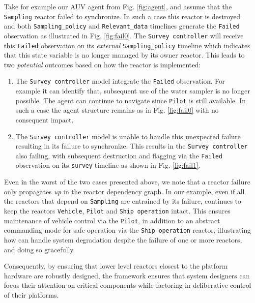 Take for example our AUV agent from Fig. \ref{fig:agent}, and assume
that the \texttt{Sampling} reactor failed to synchronize. In such a
case this reactor is destroyed and both \texttt{Sampling\_policy} and
\texttt{Relevant\_data} timelines generate the \texttt{Failed}
observation as illustrated in Fig. \ref{fig:fail0}.  The
\texttt{Survey controller} will receive this \texttt{Failed}
observation on its {\em external} \texttt{Sampling\_policy} timeline
which indicates that this state variable is no longer managed by its
owner reactor. This leads to two \emph{potential} outcomes based on
how the reactor is implemented:

\begin{enumerate}

\item The \texttt{Survey controller} model  integrate
  the \texttt{Failed} observation. For example it can identify that,
  subsequent use of the water sampler is no longer possible.  The \rx
  agent can continue to navigate since \texttt{Pilot} is still
  available. In such a case the agent structure remains as in
  Fig. \ref{fig:fail0} with no consequent impact.

\item The \texttt{Survey controller} model is unable to handle this
  unexpected failure resulting in its failure to synchronize. This
  results in the \texttt{Survey controller} also failing, with
  subsequent destruction and flagging via the \texttt{Failed}
  observation on its \texttt{survey} timeline as shown in
  Fig. \ref{fig:fail1}.

\end{enumerate}

Even in the worst of the two cases presented above, we note that a
reactor failure only propagates \emph{up} in the reactor dependency
graph.  In our example, even if all the reactors that depend on
\texttt{Sampling} are entrained by its failure, \rx continues to keep
the reactors \texttt{Vehicle}, \texttt{Pilot} and \texttt{Ship
  operation} intact.  This ensures maintenance of vehicle control via
the \texttt{Pilot}, in addition to an abstract commanding mode for
safe operation via the \texttt{Ship operation} reactor, illustrating
how \rx can handle system degradation despite the failure of one or
more reactors, and doing so gracefully. 

Consequently, by ensuring that lower level reactors closest to the
platform hardware are robustly designed, the \rx framework ensures
that system designers can focus their attention on critical components
while factoring in deliberative control of their platforms.

